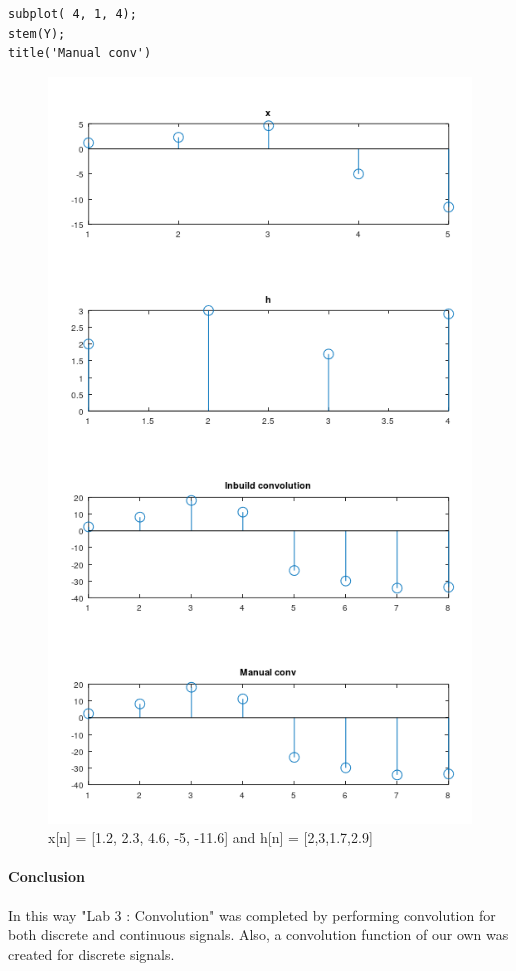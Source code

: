 \documentclass[12pt]{article}
\begin{document}
\begin{enumerate}
\begin{Verbatim}[frame =single]
subplot( 4, 1, 4);
stem(Y);
title('Manual conv')
    \end{Verbatim}
    \begin{figure}[h!]
        \centering
        \includegraphics[scale=0.8]{labss/Convolution2.PNG}
        \caption{ x[n] = [1.2, 2.3, 4.6, -5, -11.6] and h[n] = [2,3,1.7,2.9]}
     \end{figure}   
     \pagebreak
\end{enumerate}

\pagebreak
\paragraph{Conclusion\\}
In this way "Lab 3 : Convolution" was completed by performing convolution for both discrete and continuous signals.
Also, a convolution function of our own was created for discrete signals.
\end{document}
